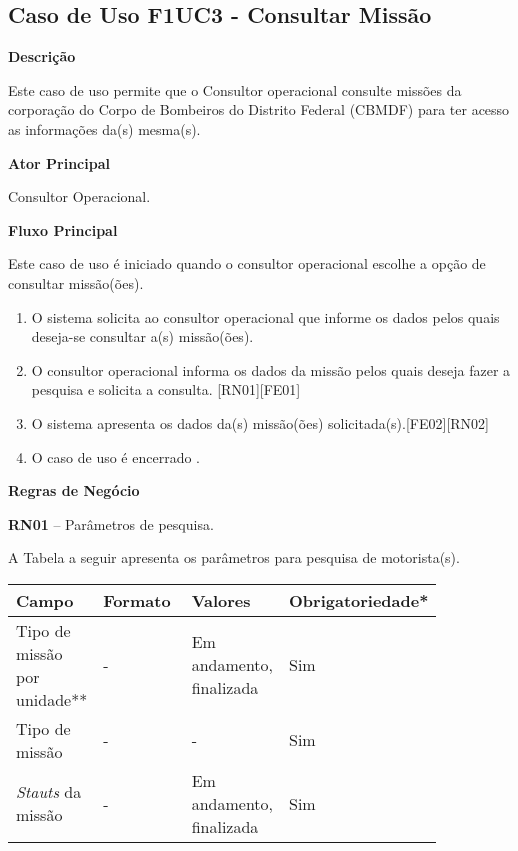   \subsection{Caso de Uso F1UC3 - Consultar Missão}

  {\raggedright
      \textbf{Descrição}
  }
  
    Este caso de uso permite que o Consultor operacional consulte missões da corporação do Corpo de Bombeiros do Distrito Federal (CBMDF) para ter acesso as informações da(s) mesma(s).
  
  {\raggedright
      \textbf{Ator Principal}
  }

    Consultor Operacional.
  
  {\raggedright
      \textbf{Fluxo Principal}
  }
  
    Este caso de uso é iniciado quando o consultor operacional escolhe a opção de consultar  missão(ões).
    
  \begin{enumerate}
  \item O sistema solicita ao consultor operacional que informe os dados pelos quais deseja-se consultar a(s) missão(ões).
  \item O consultor operacional informa os dados da missão pelos quais deseja fazer a pesquisa e solicita a consulta. [RN01][FE01]
  \item O sistema apresenta os dados da(s) missão(ões) solicitada(s).[FE02][RN02]
  \item O caso de uso é encerrado .
  \end{enumerate}
  
   {\raggedright
      \textbf{Regras de Negócio}
   }
   
   \textbf{RN01} – Parâmetros de pesquisa.
   
   A Tabela a seguir apresenta os parâmetros para pesquisa de motorista(s).

   \begin{table*}[!h]
    \centering
      \begin{tabular}{|p{0.20\linewidth}|p{0.25\linewidth}|p{0.20\linewidth}|p{0.20\linewidth}|}
      \hline
      Campo  & Formato & Valores & Obrigatoriedade*\\
      \hline

      Tipo de missão por unidade** & - & Em andamento, finalizada & Sim\\\hline
      
      Tipo de missão & - & - & Sim\\\hline
      
      \textit{Stauts} da missão & - & Em andamento, finalizada & Sim\\\hline
      
      \hline
      \end{tabular}
    \end{table*}
      
